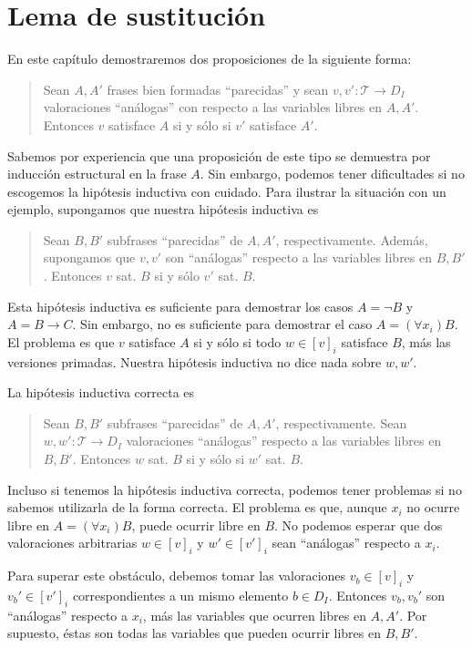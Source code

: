 \chapter{Lema de sustitución}

\begin{preliminaries}
En este capítulo demostraremos dos proposiciones de la siguiente forma:

\begin{quote}
Sean $A, A'$ frases bien formadas ``parecidas'' y sean $v, v' : \mathscr T \to D_I$ valoraciones ``análogas'' con respecto a las variables libres en $A, A'$. Entonces $v$ satisface $A$ si y sólo si $v'$ satisface $A'$.
\end{quote}

Sabemos por experiencia que una proposición de este tipo se demuestra por inducción estructural en la frase $A$. Sin embargo, podemos tener dificultades si no escogemos la hipótesis inductiva con cuidado. Para ilustrar la situación con un ejemplo, supongamos que nuestra hipótesis inductiva es

\begin{quote}
Sean $B, B'$ subfrases ``parecidas'' de $A, A'$, respectivamente. Además, supongamos que $v, v'$ son ``análogas'' respecto a las variables libres en $B, B'$. Entonces $v$ sat. $B$ si y sólo $v'$ sat. $B$.
\end{quote}

Esta hipótesis inductiva es suficiente para demostrar los casos $A = \neg B$ y $A = B \to C$. Sin embargo, no es suficiente para demostrar el caso $A = (\forall x_i) B$. El problema es que $v$ satisface $A$ si y sólo si todo $w \in [v]_i$ satisface $B$, más las versiones primadas. Nuestra hipótesis inductiva no dice nada sobre $w, w'$.

La hipótesis inductiva correcta es

\begin{quote}
Sean $B, B'$ subfrases ``parecidas'' de $A, A'$, respectivamente. Sean $w, w' : \mathscr T \to D_I$ valoraciones ``análogas'' respecto a las variables libres en $B, B'$. Entonces $w$ sat. $B$ si y sólo si $w'$ sat. $B$.
\end{quote}

Incluso si tenemos la hipótesis inductiva correcta, podemos tener problemas si no sabemos utilizarla de la forma correcta. El problema es que, aunque $x_i$ no ocurre libre en $A = (\forall x_i) B$, puede ocurrir libre en $B$. No podemos esperar que dos valoraciones arbitrarias $w \in [v]_i$ y $w' \in [v']_i$ sean ``análogas'' respecto a $x_i$.

Para superar este obstáculo, debemos tomar las valoraciones $v_b \in [v]_i$ y $v_b' \in [v']_i$ correspondientes a un mismo elemento $b \in D_I$. Entonces $v_b, v_b'$ son ``análogas'' respecto a $x_i$, más las variables que ocurren libres en $A, A'$. Por supuesto, éstas son todas las variables que pueden ocurrir libres en $B, B'$.
\end{preliminaries}

